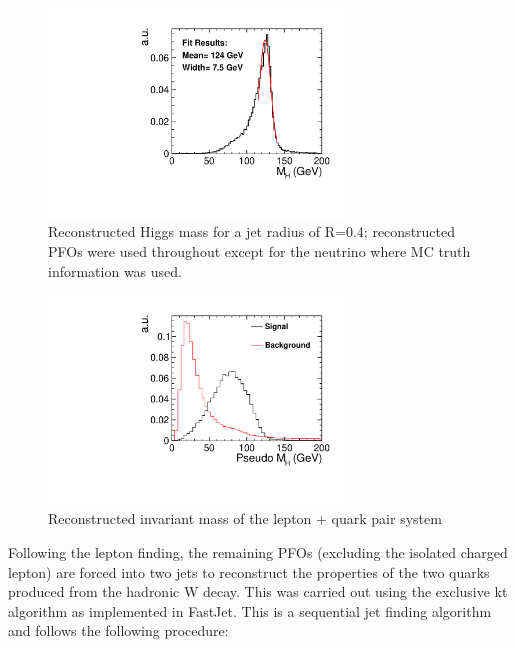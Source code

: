 \begin{figure}
  \centering
  \includegraphics[width=0.7\textwidth,keepaspectratio]{HiggsAnalysis/figures/CheatHiggs04}
  \caption[Reconstructed Higgs Mass For Optimum Jet Radius]{Reconstructed Higgs mass for a jet radius of R=0.4; reconstructed PFOs were used throughout except for the neutrino where MC truth information was used.}
  \label{fig:cheatHiggsMass}
\end{figure}

\begin{figure}
  \centering
  \includegraphics[width=0.7\textwidth,keepaspectratio]{HiggsAnalysis/figures/PseudoHiggs.pdf}
  \caption[Reconstructed Higgs Mass]{Reconstructed invariant mass of the lepton + quark pair system}
  \label{fig:pseudoHiggsMass}
\end{figure}


Following the lepton finding, the remaining PFOs (excluding the isolated charged lepton) are forced into two jets to reconstruct the properties of the two quarks produced from the hadronic W decay. This was carried out using the exclusive kt algorithm as implemented in FastJet. This is a sequential jet finding algorithm and follows the following procedure:

